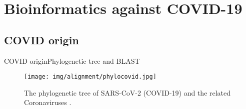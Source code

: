 \documentclass[10pt]{beamer}
\newcommand{\1}{
        	\setbeamertemplate{background}{
        		\texttt{[image: img/1]}
        		\tikz[overlay] \fill[fill opacity=0.75,fill=white] (0,0) rectangle (-\paperwidth,\paperheight);
        	}
}
\begin{document}
\section{Bioinformatics against COVID-19}




\subsection{COVID origin}

\begin{frame}{COVID origin}{Phylogenetic tree and BLAST}
	\begin{figure}[]
		\centering
		\texttt{[image: img/alignment/phylocovid.jpg]}
		\label{img:mot2}
		\caption{The phylogenetic tree of SARS-CoV-2 (COVID-19) and the related Coronaviruses  \cite{tang2020origin}.}
	\end{figure}
\end{frame}
\end{document}
